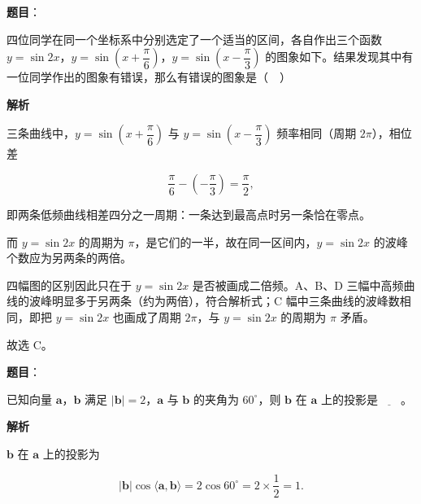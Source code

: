 \begin{answer}

\textbf{题目}：

四位同学在同一个坐标系中分别选定了一个适当的区间，各自作出三个函数 $y=\sin2x$，$y=\sin\left(x+\dfrac\pi6\right)$，$y=\sin\left(x-\dfrac\pi3\right)$ 的图象如下。结果发现其中有一位同学作出的图象有错误，那么有错误的图象是（　）
\nopagebreak[4]
\begin{center}\end{center}
\nopagebreak[4]
\textbf{解析}

三条曲线中，$y=\sin\left(x+\dfrac\pi6\right)$ 与 $y=\sin\left(x-\dfrac\pi3\right)$ 频率相同（周期 $2\pi$），相位差

\nopagebreak[4]
\[\frac\pi6-\left(-\frac\pi3\right)=\frac\pi2,\]

即两条低频曲线相差四分之一周期：一条达到最高点时另一条恰在零点。

而 $y=\sin2x$ 的周期为 $\pi$，是它们的一半，故在同一区间内，$y=\sin2x$ 的波峰个数应为另两条的两倍。

四幅图的区别因此只在于 $y=\sin2x$ 是否被画成二倍频。A、B、D 三幅中高频曲线的波峰明显多于另两条（约为两倍），符合解析式；C 幅中三条曲线的波峰数相同，即把 $y=\sin2x$ 也画成了周期 $2\pi$，与 $y=\sin2x$ 的周期为 $\pi$ 矛盾。

故选 C。


\end{answer}
\begin{answer}

\textbf{题目}：

已知向量 $\boldsymbol a$，$\boldsymbol b$ 满足 $|\boldsymbol b|=2$，$\boldsymbol a$ 与 $\boldsymbol b$ 的夹角为 $60^\circ$，则 $\boldsymbol b$ 在 $\boldsymbol a$ 上的投影是$\underline{\qquad}$。

\textbf{解析}

$\boldsymbol b$ 在 $\boldsymbol a$ 上的投影为

\nopagebreak[4]
\[|\boldsymbol b|\cos\langle \boldsymbol a,\boldsymbol b\rangle=2\cos60^\circ=2\times\frac12=1.\]


\end{answer}
